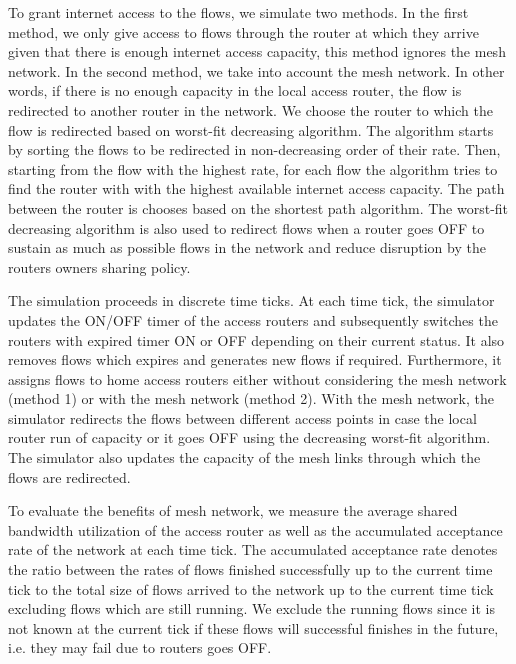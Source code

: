 To grant internet access to the flows, we simulate two methods. In the first method, we only give access to flows through the router at which they arrive given that there is enough internet access capacity, this method ignores the mesh network. In the second method, we take into account the mesh network. In other words, if there is no enough capacity in the local access router, the flow is redirected to another router in the network. We choose the router to which the flow is redirected based on worst-fit decreasing algorithm. The algorithm starts by sorting the flows to be redirected in non-decreasing order of their rate. Then, starting from the flow with the highest rate, for each flow the algorithm tries to find the router with with the highest available internet access capacity. The path between the router is chooses based on the shortest path algorithm. The worst-fit decreasing algorithm is also used to redirect flows when a router goes OFF to sustain as much as possible flows in the network and reduce disruption by the routers owners sharing policy.

The simulation proceeds in discrete time ticks. At each time tick, the simulator updates the ON/OFF timer of the access routers and subsequently switches the routers with expired timer ON or OFF depending on their current status. It also removes flows which expires and generates new flows if required. Furthermore, it assigns flows to home access routers either without considering the mesh network (method 1) or with the mesh network (method 2). With the mesh network, the simulator redirects the flows between different access points in case the local router run of capacity or it goes OFF using the decreasing worst-fit algorithm. The simulator also updates the capacity of the mesh links through which the flows are redirected. 

To evaluate the benefits of mesh network, we measure the average shared bandwidth utilization of the access router as well as the accumulated acceptance rate of the network at each time tick. The accumulated acceptance rate denotes the ratio between the rates of flows finished successfully up to the current time tick to the total size of flows arrived to the network up to the current time tick excluding flows which are still running. We exclude the running flows since it is not known at the current tick if these flows will successful finishes in the future, i.e. they may fail due to routers goes OFF. 

